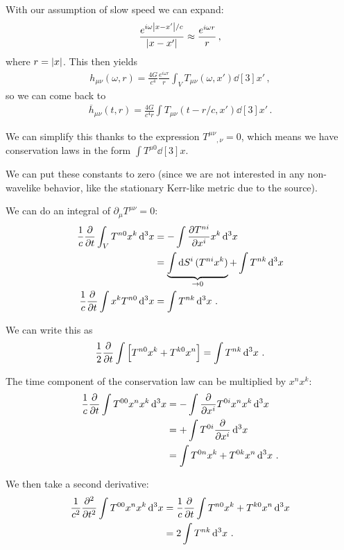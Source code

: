\documentclass[main.tex]{subfiles}
\begin{document}
With our assumption of slow speed we can expand: 
%
\begin{align}
\frac{e^{i \omega \abs{x-x'} / c}}{\abs{x-x'}} \approx 
\frac{e^{i \omega r}}{r} 
\,,
\end{align}
%
where \(r = \abs{x}\). 
This then yields 
%
\begin{align}
h_{\mu \nu }(\omega , r) = \frac{4 G}{c^{4}} \frac{e^{i\omega r}}{r}
\int_{V} T_{\mu \nu } (\omega , x') \dd[3]{x'}
\,,
\end{align}
%
so we can come back to 
%
\begin{align}
\overline{h}_{\mu \nu } (t, r) = \frac{4 G}{c^{4}r} \int T_{\mu \nu } (t- r/c, x') \dd[3]{x'}
\,.
\end{align}

We can simplify this thanks to the expression \(T^{\mu \nu }{}_{, \nu } = 0\), which means we have conservation laws in the form \(\int T^{\mu 0} \dd[3]{x}\). 

We can put these constants to zero (since we are not interested in any non-wavelike behavior, like the stationary Kerr-like metric due to the source). 

We can do an integral of \(\partial_{\mu } T^{\mu \nu }= 0\): 
%
\begin{align}
\frac{1}{c} \pdv{}{t} \int _V T^{n  0} x^{k} \dd[3]{x} &= - \int \pdv{T^{ni}}{x^i} x^{k} \dd[3]{x}  \\
&= \underbrace{\int \dd{S^{i}} (T^{ni} x^{k})}_{ \to 0} + \int T^{nk} \dd[3]{x}  \\
\frac{1}{c} \pdv{}{t} \int x^{k} T^{n0} \dd[3]{x} &= \int T^{nk} \dd[3]{x}
\,.
\end{align}

We can write this as 
%
\begin{align}
\frac{1}{2} \pdv{}{t} \int \qty[ T^{n0} x^{k} + T^{k0} x^{n}] = \int T^{nk} \dd[3]{x}
\,.
\end{align}

The time component of the conservation law can be multiplied by \(x^{n} x^{k}\): 
%
\begin{align}
\frac{1}{c} \pdv{}{t} \int T^{00} x^{n} x^{k} \dd[3]{x} 
&= - \int \pdv{}{x^{i}} T^{0i} x^{n} x^{k} \dd[3]{x}  \\
&= + \int T^{0i} \pdv{}{x^{i}} (x^{n} x^{k}) \dd[3]{x}  \\
&= \int T^{0n} x^{k} + T^{0k} x^{n}  \dd[3]{x} 
\,.
\end{align}

We then take a second derivative: 
%
\begin{align}
\frac{1}{c^2} \pdv[2]{}{t} \int T^{00} x^{n} x^{k} \dd[3]{x} &= 
\frac{1}{c} \pdv{}{t} \int T^{n0} x^{k} + T^{k0} x^{n} \dd[3]{x}  \\
&= 2 \int T^{nk} \dd[3]{x}
\,.
\end{align}
\end{document}
